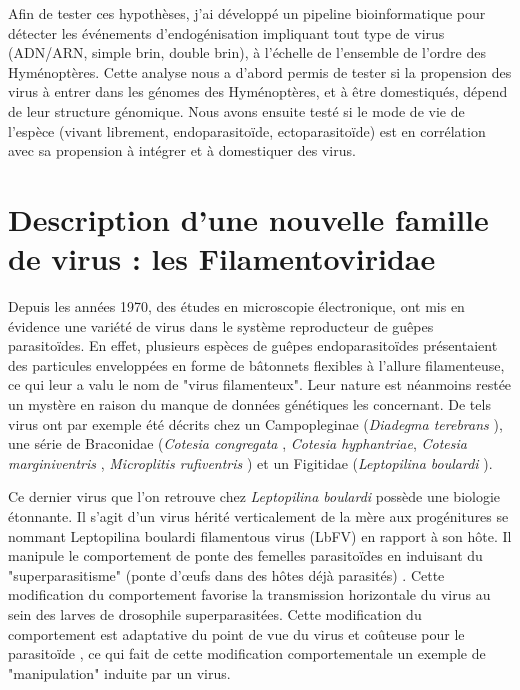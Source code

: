 Afin de tester ces hypothèses, j'ai développé un pipeline bioinformatique pour détecter les événements d'endogénisation impliquant tout type de virus (ADN/ARN, simple brin, double brin), à l'échelle de l'ensemble de l'ordre des Hyménoptères. Cette analyse nous a d'abord permis de tester si la propension des virus à entrer dans les génomes des Hyménoptères, et à être domestiqués, dépend de leur structure génomique.  Nous avons ensuite testé si le mode de vie de l'espèce (vivant librement, endoparasitoïde, ectoparasitoïde) est en corrélation avec sa propension à intégrer et à domestiquer des virus.

\section{Description d'une nouvelle famille de virus : les Filamentoviridae}

Depuis les années 1970, des études en microscopie électronique, ont mis en évidence une variété de virus dans le système reproducteur de guêpes parasitoïdes. En effet, plusieurs espèces de guêpes endoparasitoïdes présentaient des particules enveloppées en forme de bâtonnets flexibles à l'allure filamenteuse, ce qui leur a valu le nom de "virus filamenteux". Leur nature est néanmoins restée un mystère en raison du manque de données génétiques les concernant. De tels virus ont par exemple été décrits chez un Campopleginae (\textit{Diadegma terebrans} \citep{krell_replication_1987}), une série de  Braconidae (\textit{Cotesia congregata} \citep{de_buron_characterization_1992}, \textit{Cotesia hyphantriae}, \textit{Cotesia marginiventris} \citep{hamm_comparative_1990},  \textit{Microplitis rufiventris} \citep{hegazi_calyx_2005}) et un Figitidae (\textit{Leptopilina boulardi} \citep{varaldi_infectious_2003}).

Ce dernier virus que l'on retrouve chez \textit{Leptopilina boulardi} possède une biologie étonnante. Il s'agit d'un virus hérité verticalement de la mère aux progénitures se nommant Leptopilina boulardi filamentous virus (LbFV) en rapport à son hôte. Il manipule le comportement de ponte des femelles parasitoïdes en induisant du "superparasitisme" (ponte d'œufs dans des hôtes déjà parasités) \citep{varaldi_infectious_2003,varaldi_artifical_2006}. Cette modification du comportement favorise la transmission horizontale du virus au sein des larves de drosophile superparasitées. Cette modification du comportement est adaptative du point de vue du virus et coûteuse pour le parasitoïde \citep{gandon_superparasitism_2006}, ce qui fait de cette modification comportementale un exemple de "manipulation" induite par un virus.

